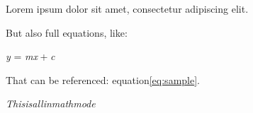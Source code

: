 Lorem ipsum dolor sit amet, consectetur adipiscing elit.

But also full equations, like:

\emph{y} = \emph{mx} + \emph{c}

That can be referenced:
equation\ul{\protect\hyperlink{eq:sample}{{[}eq:sample{]}}}.

\emph{Thisisallinmathmode}
